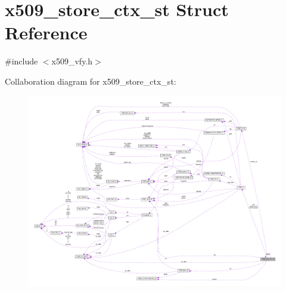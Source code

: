 \hypertarget{structx509__store__ctx__st}{}\section{x509\+\_\+store\+\_\+ctx\+\_\+st Struct Reference}
\label{structx509__store__ctx__st}


{\ttfamily \#include $<$x509\+\_\+vfy.\+h$>$}



Collaboration diagram for x509\+\_\+store\+\_\+ctx\+\_\+st\+:
\nopagebreak
\begin{figure}[H]
\begin{center}
\leavevmode
\includegraphics[width=350pt]{structx509__store__ctx__st__coll__graph}
\end{center}
\end{figure}
